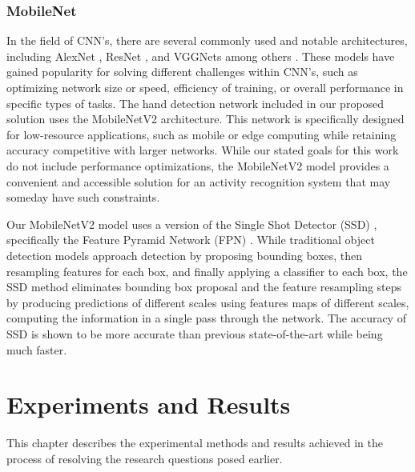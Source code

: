 \documentclass[12pt]{report}
\begin{document}
\subsection{MobileNet}
In the field of CNN's, there are several commonly used and notable architectures, including AlexNet \cite{Krizhevsky2012ImagenetNetworks}, ResNet \cite{He2016DeepRecognition}, and VGGNets \cite{Simonyan2014VeryRecognition} among others \cite{Li2021AProspects}. These models have gained popularity for solving different challenges within CNN's, such as optimizing network size or speed, efficiency of training, or overall performance in specific types of tasks. The hand detection network included in our proposed solution uses the MobileNetV2 \cite{Sandler2018Mobilenetv2:Bottlenecks} architecture. This network is specifically designed for low-resource applications, such as mobile or edge computing while retaining accuracy competitive with larger networks. While our stated goals for this work do not include performance optimizations, the MobileNetV2 model provides a convenient and accessible solution for an activity recognition system that may someday have such constraints.

Our MobileNetV2 model uses a version of the Single Shot Detector (SSD) \cite{Liu2016Ssd:Detector}, specifically the Feature Pyramid Network (FPN) \cite{Lin2017FeatureDetection}. While traditional object detection models approach detection by proposing bounding boxes, then resampling features for each box, and finally applying a classifier to each box, the SSD method eliminates bounding box proposal and the feature resampling steps by producing predictions of different scales using features maps of different scales, computing the information in a single pass through the network. The accuracy of SSD is shown to be more accurate than previous state-of-the-art while being much faster.


\chapter{Experiments and Results} \label{resultsChap}

This chapter describes the experimental methods and results achieved in the process of resolving the research questions posed earlier. 

\end{document}
